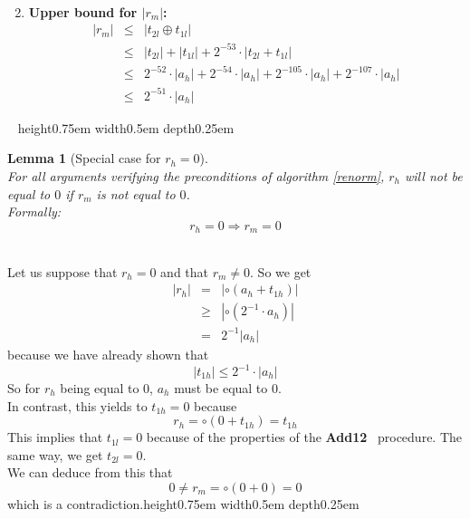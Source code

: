\documentclass[a4paper,10pt,twoside]{article}
\newtheorem{lemma}[theorem]{Lemma}
\newenvironment{proof}[1][Proof]{\begin{trivlist}
\item[\hskip \labelsep {\bfseries #1}]}{\end{trivlist}}
\newcommand{\qed}{\nobreak \ifvmode \relax \else \ifdim \lastskip<1.5em \hskip-\lastskip
\hskip1.5em plus0em minus0.5em \fi \nobreak \vrule height0.75em width0.5em depth0.25em\fi}
\newcommand{\hi}{\ensuremath{\mathit{h}}}
\newcommand{\mi}{\ensuremath{\mathit{m}}}
\newcommand{\lo}{\ensuremath{\mathit{l}}}
\newcommand{\Add}{{\bf Add12}}
\begin{document}
\begin{proof}
\begin{enumerate}
\begin{eqnarray*}
\end{eqnarray*}
\item {\bf Upper bound for $\left \vert r_\mi \right \vert$:}
\begin{eqnarray*}
\left \vert r_\mi \right \vert & \leq & \left \vert t_{2\lo} \oplus t_{1\lo} \right \vert \\
& \leq & \left \vert t_{2\lo} \right \vert + \left \vert t_{1\lo} \right \vert + 2^{-53} \cdot \left \vert t_{2\lo} + t_{1\lo} \right \vert \\
& \leq & 2^{-52} \cdot \left \vert a_\hi \right \vert + 2^{-54} \cdot \left \vert a_\hi \right \vert + 2^{-105} \cdot \left \vert a_\hi \right \vert +
2^{-107} \cdot \left \vert a_\hi \right \vert \\
& \leq & 2^{-51} \cdot \left \vert a_\hi \right \vert
\end{eqnarray*}
\end{enumerate} ~ \qed
\end{proof}
\begin{lemma}[Special case for $r_\hi = 0$] \label{specialcaseinzero}~\\
For all arguments verifying the preconditions of algorithm \ref{renorm}, 
$r_\hi$ will not be equal to $0$ if $r_\mi$ is not equal to $0$. \\
Formally:
$$r_\hi = 0 \Rightarrow r_\mi = 0$$
\end{lemma}
\begin{proof} ~\\
Let us suppose that $r_\hi = 0$ and that $r_\mi \not = 0$. So we get
\begin{eqnarray*}
\left \vert r_\hi \right \vert & = & \left \vert \circ \left( a_\hi + t_{1\hi} \right) \right \vert \\
& \geq & \left \vert \circ \left( 2^{-1} \cdot a_\hi \right) \right \vert \\
& = & 2^{-1} \left \vert a_\hi \right \vert
\end{eqnarray*}
because we have already shown that $$\left \vert t_{1\hi} \right \vert \leq 2^{-1} \cdot \left \vert a_\hi \right \vert$$
So for $r_\hi$ being equal to $0$, $a_\hi$ must be equal to $0$.\\
In contrast, this yields to $t_{1\hi} = 0$ because $$r_\hi = \circ \left( 0 + t_{1\hi} \right) = t_{1\hi}$$
This implies that $t_{1\lo} = 0$ because of the properties of the \Add~
procedure. 
The same way, we get $t_{2\lo} = 0$.\\
We can deduce from this that
$$0 \not = r_\mi = \circ \left( 0 + 0 \right) = 0$$ which is a contradiction.\qed
\end{proof}
\end{document}
